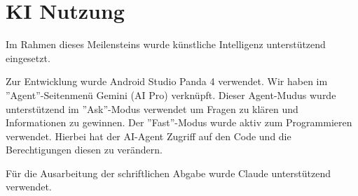 \section{KI Nutzung}
%
\noindent
Im Rahmen dieses Meilensteins wurde künstliche Intelligenz unterstützend eingesetzt.

\bigskip
\noindent
Zur Entwicklung wurde Android Studio Panda 4 verwendet. Wir haben im ''Agent''-Seitenmenü Gemini (AI Pro) verknüpft.
Dieser Agent-Mudus wurde unterstützend im ''Ask''-Modus verwendet um Fragen zu klären und Informationen zu gewinnen.
Der ''Fast''-Modus wurde aktiv zum Programmieren verwendet. Hierbei hat der AI-Agent Zugriff auf den Code und die Berechtigungen diesen zu verändern.

\bigskip
\noindent
Für die Ausarbeitung der schriftlichen Abgabe wurde Claude unterstützend verwendet.